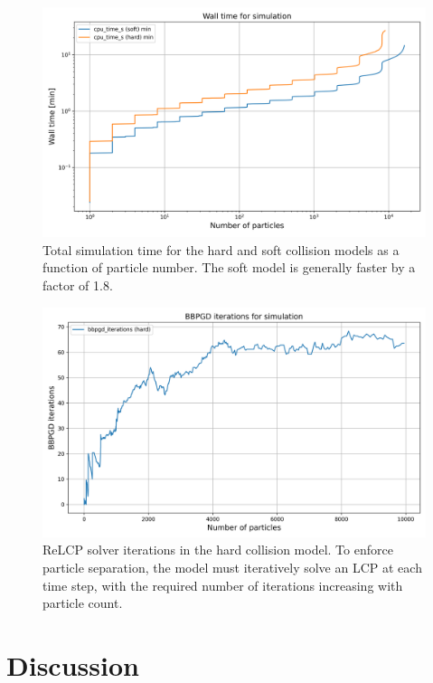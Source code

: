 \documentclass[conference]{IEEEtran}
\begin{document}
\begin{figure}[h]
    \centering
    \includegraphics[width=\linewidth]{figures/comparisons/wall_time_simulation.png}
    \caption{Total simulation time for the hard and soft collision models as a function of particle number. The soft model is generally faster by a factor of 1.8.} \label{fig:wall_time_simulation}
\end{figure}

\begin{figure}[h]
    \centering
    \includegraphics[width=\linewidth]{figures/comparisons/bbpgd_iterations_simulation.png}
    \caption{ReLCP solver iterations in the hard collision model. To enforce particle separation, the model must iteratively solve an LCP at each time step, with the required number of iterations increasing with particle count.} \label{fig:bbpgd_iterations_simulation}
\end{figure}

\newpage
\clearpage

\section{Discussion}
\end{document}
